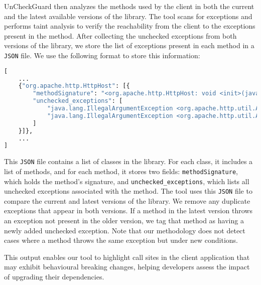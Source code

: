 UnCheckGuard then analyzes the methods used by the client in both the current and the latest available versions of the library. The tool scans for exceptions and performs taint analysis to verify the reachability from the client to the exceptions present in the method. After collecting the unchecked exceptions from both versions of the library, we store the list of exceptions present in each method in a \texttt{JSON} file. We use the following format to store this information:
\begin{lstlisting}[language=python]
[
    ...
    {"org.apache.http.HttpHost": [{
        "methodSignature": "<org.apache.http.HttpHost: void <init>(java.lang.String,int)>",
        "unchecked_exceptions": [
            "java.lang.IllegalArgumentException <org.apache.http.util.Args: java.lang.CharSequence containsNoBlanks(java.lang.CharSequence,java.lang.String)>",
            "java.lang.IllegalArgumentException <org.apache.http.util.Args: java.lang.CharSequence containsNoBlanks(java.lang.CharSequence,java.lang.String)>"
        ]
    }]},
    ...
]
\end{lstlisting}

This \texttt{JSON} file contains a list of classes in the library. For each class, it includes a list of methods, and for each method, it stores two fields: \texttt{methodSignature}, which holds the method’s signature, and \texttt{unchecked\_exceptions}, which lists all unchecked exceptions associated with the method. The tool uses this \texttt{JSON} file to compare the current and latest versions of the library. We remove any duplicate exceptions that appear in both versions. If a method in the latest version throws an exception not present in the older version, we tag that method as having a newly added unchecked exception. Note that our methodology does not detect cases where a method throws the same exception but under new conditions.


This output enables our tool to highlight call sites in the client application that may exhibit behavioural breaking changes, helping developers assess the impact of upgrading their dependencies.
